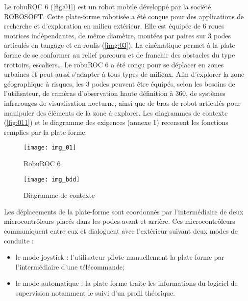 \ifprof
\else
Le robuROC 6 (\autoref{fig:01}) est un robot mobile développé par la société ROBOSOFT. Cette plate-forme robotisée a été conçue pour des applications de recherche et d’exploration en milieu extérieur. Elle est équipée de 6 roues motrices indépendantes, de même diamètre, montées par paires sur 3 podes articulés en tangage et en roulis (\autoref{img:03}). La cinématique permet à la plate-forme de se conformer au relief parcouru et de franchir des obstacles du type trottoirs, escaliers… Le robuROC 6 a été conçu pour se déplacer en zones urbaines et peut aussi s’adapter à tous types de milieux.  Afin d’explorer la zone géographique à risques, les 3 podes peuvent être équipés, selon les besoins de l’utilisateur, de caméras d’observation haute définition à 360\degres, de systèmes infrarouges de visualisation nocturne, ainsi que de bras de robot articulés pour manipuler des éléments de la zone à explorer. Les diagrammes de contexte %
(\autoref{fig:011}) et %
le diagramme des exigences (annexe 1) recensent les fonctions remplies par la plate-forme.


\begin{minipage}[c]{.47\linewidth}
\begin{figure}[H]
\centering
\texttt{[image: img\_01]}
\caption{RobuROC 6 \label{fig:01}}
\end{figure}
\end{minipage} \hfill
\begin{minipage}[c]{.47\linewidth}
\begin{figure}[H]
\centering
\texttt{[image: img\_bdd]}
\caption{Diagramme de contexte  \label{fig:011}}

\end{figure}
\end{minipage} 

\vspace{.5cm}

Les déplacements de la plate-forme sont coordonnés par l’intermédiaire de deux microcontrôleurs placés dans les podes avant et arrière. Ces microcontrôleurs communiquent entre eux et dialoguent avec l’extérieur suivant deux modes de conduite : 
\begin{itemize}
\item le mode joystick : l’utilisateur pilote manuellement la plate-forme par l’intermédiaire d’une télécommande;
\item le mode automatique : la plate-forme traite les informations du logiciel de supervision notamment le suivi d’un profil théorique.
\end{itemize}

